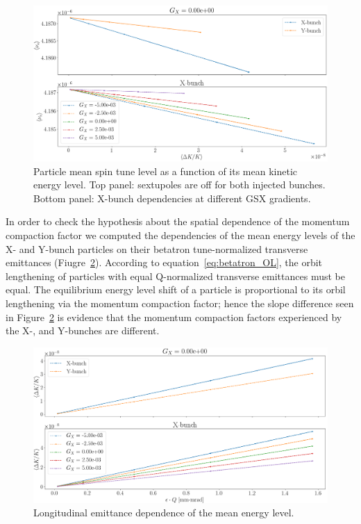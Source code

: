 \begin{figure}[h]
	\centering
	\includegraphics[height=.3\paperheight]{images/stune_traj_equ/part1/stune_vs_equ_energy}
	\caption[Mean spin tune level veresus mean kinetic energy level.]{Particle mean spin tune level
        as a function of its mean kinetic energy level. Top panel: sextupoles are off for both injected bunches.
        Bottom panel: X-bunch dependencies at different GSX gradients.\label{fig:stune_traj_equ_main}}
\end{figure}

In order to check the hypothesis about the spatial dependence of the momentum compaction factor we computed
the dependencies of the mean energy levels of the X- and Y-bunch particles on their betatron tune-normalized
transverse emittances (Fiugre~\ref{fig:equ_nrg_vs_emittance}).
According to equation~\eqref{eq:betatron_OL}, the orbit lengthening of particles with equal Q-normalized
transverse emittances must be equal. The equilibrium energy level shift of a particle is proportional to
its orbil lengthening via the momentum compaction factor; hence the slope difference seen in
Figure~\ref{fig:equ_nrg_vs_emittance} is evidence that the momentum compaction factors experienced by the
X-, and Y-bunches are different. 

\begin{figure}[h]
	\centering
	\includegraphics[height=.3\paperheight]{images/stune_traj_equ/part1/equ_energy_vs_emittance}
	\caption{Longitudinal emittance dependence of the mean energy level.\label{fig:equ_nrg_vs_emittance}}
\end{figure}

